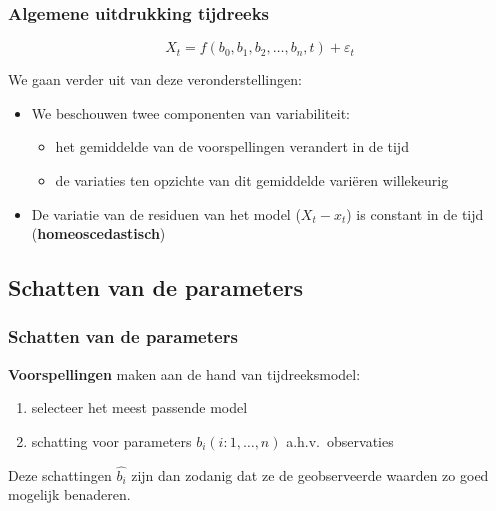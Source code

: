 \documentclass[aspectratio=169]{beamer}
\begin{document}
\begin{frame}
  \frametitle{Algemene uitdrukking tijdreeks}
  
  \begin{equation}
  X_{t} = f(b_{0}, b_{1}, b_{2}, \dots , b_{n}, t) + \varepsilon_{t}
  \label{eq:tijdreeks-algemeen}
  \end{equation}
  
  We gaan verder uit van deze veronderstellingen:
  
  \begin{itemize}
    \item We beschouwen twee componenten van variabiliteit:
    \begin{itemize}
      \item het gemiddelde van de voorspellingen verandert in de tijd
      \item de variaties ten opzichte van dit gemiddelde variëren willekeurig
    \end{itemize}
    \item De variatie van de residuen van het model ($X_t - x_t$) is constant in de tijd (\textbf{homeoscedastisch})
  \end{itemize}
\end{frame}

\subsection{Schatten van de parameters}

\begin{frame}
  \frametitle{Schatten van de parameters}
  
  \textbf{Voorspellingen} maken aan de hand van tijdreeksmodel:
  
  \begin{enumerate}
    \item selecteer het meest passende model
    \item schatting voor parameters $b_i (i: 1, \dots, n)$ a.h.v.~observaties
  \end{enumerate}
  
  Deze schattingen $\widehat{b_i}$ zijn dan zodanig dat ze de geobserveerde waarden zo goed mogelijk benaderen.
\end{frame}
\end{document}
